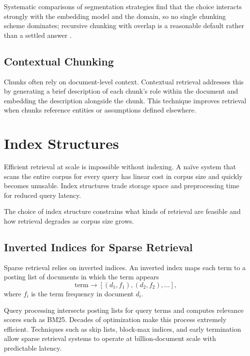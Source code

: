 Systematic comparisons of segmentation strategies find that the choice interacts strongly with the embedding model and the domain, so no single chunking scheme dominates; recursive chunking with overlap is a reasonable default rather than a settled answer \cite{chunkstudy2025, chunkeval2026}.

\subsection{Contextual Chunking}

Chunks often rely on document-level context. Contextual retrieval \cite{anthropic2024contextual} addresses this by generating a brief description of each chunk’s role within the document and embedding the description alongside the chunk. This technique improves retrieval when chunks reference entities or assumptions defined elsewhere.

\section{Index Structures}

Efficient retrieval at scale is impossible without indexing. A naïve system that scans the entire corpus for every query has linear cost in corpus size and quickly becomes unusable. Index structures trade storage space and preprocessing time for reduced query latency.

The choice of index structure constrains what kinds of retrieval are feasible and how retrieval degrades as corpus size grows.

\subsection{Inverted Indices for Sparse Retrieval}

Sparse retrieval relies on inverted indices. An inverted index maps each term to a posting list of documents in which the term appears
\[
\text{term} \rightarrow [(d_1, f_1), (d_2, f_2), \ldots],
\]
where $f_i$ is the term frequency in document $d_i$.

Query processing intersects posting lists for query terms and computes relevance scores such as BM25. Decades of optimization make this process extremely efficient. Techniques such as skip lists, block-max indices, and early termination allow sparse retrieval systems to operate at billion-document scale with predictable latency.

